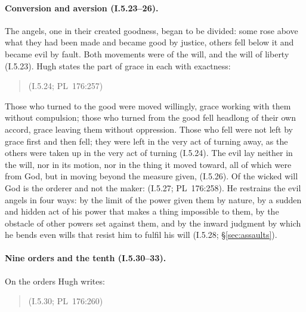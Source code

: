 \paragraph{Conversion and aversion (I.5.23--26).} The angels, one in their
created goodness, began to be divided: some rose above what they had been
made and became good by justice, others fell below it and became evil by
fault. Both movements were of the will, and the will of liberty (I.5.23).
Hugh states the part of grace in each with exactness:

\begin{quote}
 (I.5.24;
PL~176:257)
\end{quote}

\noindent Those who turned to the good were moved willingly, grace working
with them without compulsion; those who turned from the good fell headlong
of their own accord, grace leaving them without oppression. Those who fell
were not left by grace first and then fell; they were left in the very act
of turning away, as the others were taken up in the very act of turning
(I.5.24). The evil lay neither in the will, nor in its motion, nor in the
thing it moved toward, all of which were from God, but in moving beyond the
measure given,  (I.5.26). Of the wicked will God is
the orderer and not the maker:  (I.5.27; PL~176:258). He restrains the evil angels in
four ways: by the limit of the power given them by nature, by a sudden and
hidden act of his power that makes a thing impossible to them, by the
obstacle of other powers set against them, and by the inward judgment by
which he bends even wills that resist him to fulfil his will (I.5.28; \S\ref{sec:assaults}).

\paragraph{Nine orders and the tenth (I.5.30--33).} On the orders Hugh
writes:

\begin{quote}
 (I.5.30;
PL~176:260)
\end{quote}

